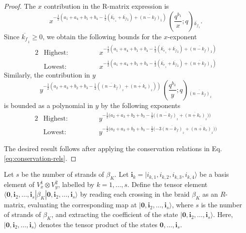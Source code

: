 \documentclass[12pt,oneside,reqno]{amsart}
\numberwithin{teorema}{section}
\numberwithin{definicion}{section}
\numberwithin{lema}{section}
\numberwithin{conjetura}{section}
\numberwithin{proposicion}{section}
\begin{document}
\begin{proof}

The $x$ contribution in the R-matrix expression is
\begin{equation*}
    x^{-\frac{1}{2}(a_1+a_4+b_1+b_4-\frac{1}{2}(\overline{k_e}_{{}_1}+\overline{k_f}_{1})+\overline{(n-k_f)}_{1})} \, \left(\frac{q^{ b_1}}{x};q\right){}_{\overline{k_f}_{{}_1}}.
\end{equation*}
Since $\overline{k_f}_{{}_1} \geq 0$, we obtain the following bounds for the $x$-exponent
\begin{alignat*}{2}
    &\text{Highest:} \hspace{3em} &&x^{-\frac{1}{2}(a_1+a_4+b_1+b_4-\frac{1}{2}(\overline{k_e}_{{}_1}+\overline{k_f}_{1})+\overline{(n-k_f)}_{1})} \\
    &\text{Lowest:} \hspace{3em} &&x^{-\frac{1}{2}(a_1+a_4+b_1+b_4-\frac{1}{2}(\overline{k_e}_{{}_1}+\overline{k_f}_{1})+\overline{(n+k_f)}_{1})}
\end{alignat*}
Similarly, the contribution in $y$
\begin{equation*}
    y^{-\frac{1}{2}(a_2+a_3+b_2+b_3-\frac{1}{2}(\overline{(n-k_f)}_{{}_2}+\overline{(n+k_e)}_{{}_2}))} \, \left(\frac{q^{b_3}}{y};q\right){}_{\overline{(n-k_{f})}_{{}_2}}
\end{equation*}
is bounded as a polynomial in $y$ by the following exponents
\begin{alignat*}{2}
    &\text{Highest:} \hspace{3em} &&y^{-\frac{1}{2}(a_2+a_3+b_2+b_3-\frac12({\overline{(n-k_f)}_{{}_2}+\overline{(n+k_e)}_{{}_2}))}} \\
    &\text{Lowest:} \hspace{3em} &&y^{-\frac{1}{2}(a_2+a_3+b_2+b_3-\frac12(-3{\overline{(n-k_f)}_{{}_2}+\overline{(n+k_e)}_{{}_2}))}}
\end{alignat*}

The desired result follows after applying the conservation relations in Eq. \eqref{eq:conservation-rels}.
\end{proof}

Let $s$ be the number of strands of $\beta_K$. Let $\textbf{i}_k=|i_{k,1},i_{k,2},i_{k,3},i_{k,4}\rangle$ be a basis element of $V_x^{1}\otimes V_y^{2}$, labelled by $k=1,\dots,s$. Define the tensor element $\langle \textbf{0},\textbf{i}_2,\dots,\textbf{i}_s|\beta_K|\textbf{0},\textbf{i}_2,\dots,\textbf{i}_s\rangle$ by reading each crossing in the braid $\beta_K$ as an $R$-matrix, evaluating the corresponding map at $|\textbf{0},\textbf{i}_2,\dots,\textbf{i}_s\rangle$, where $s$ is the number of strands of $\beta_K$, and extracting the coefficient of the state $|\textbf{0},\textbf{i}_2,\dots,\textbf{i}_s\rangle$. Here, $|\textbf{0},\textbf{i}_2,\dots,\textbf{i}_s\rangle$ denotes the tensor product of the states $\textbf{0},\dots,\textbf{i}_s$.
\end{document}
